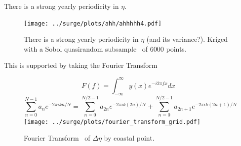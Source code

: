 \begin{frame}{There is a strong yearly periodicity in $\eta$. }
\vspace{-20pt}
\begin{figure}[htb!]
    \centering
    \texttt{[image: ../surge/plots/ahh/ahhhhh4.pdf]}
    \vspace{-7pt}
    \caption{There is a strong yearly periodicity in $\eta$ (and its variance?).
     Kriged with a Sobol quasirandom subsample~\cite{sobol1967distribution} of 6000 points.}
\end{figure}
\end{frame}


\begin{frame}{This is  supported by taking the Fourier Transform }
\vspace{-40pt}
\begin{figure}[htb!]
    \centering
    \begin{equation}
F(f)=\int_{-\infty}^{\infty} y(x) e^{-i 2\pi f x} d x
\end{equation}
\begin{equation}
\sum_{n=0}^{N-1} a_{n} e^{-2 \pi i  k n/ N}=\sum_{n=0}^{N / 2-1} a_{2 n}
e^{-2 \pi i k (2 n)/ N} +\sum_{n=0}^{N / 2-1} a_{2n+1} e^{-2 \pi i k (2 n+1)/ N}
\end{equation}
    \texttt{[image: ../surge/plots/fourier\_transform\_grid.pdf]}
    \vspace{-7pt}
    \caption{Fourier Transform~\cite{cooley1965algorithm} of $\Delta\eta$ by coastal point.}
\end{figure}
\end{frame}



